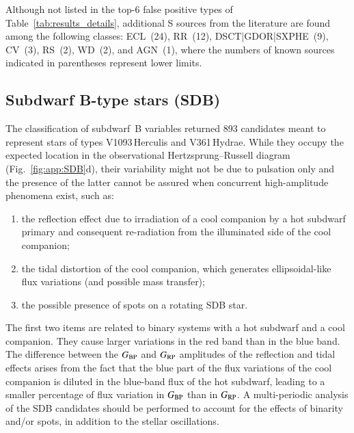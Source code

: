 \documentclass[longauth]{aa}
\def\bp{$G_{\rm BP}$\xspace}
\def\rp{$G_{\rm RP}$\xspace}
\begin{document}
Although not listed in the top-6 false positive types of Table~\ref{tab:results_details}, additional S sources from the literature are found among the following classes: ECL~(24), RR~(12), DSCT|GDOR|SXPHE~(9), CV~(3), RS~(2), WD~(2), and AGN~(1), where the numbers of known sources indicated in parentheses represent lower limits. 


\subsection{Subdwarf B-type stars (SDB)\label{ssec:sdb}}

The classification of subdwarf~B variables returned 893 candidates meant to represent stars of types V1093\,Herculis and V361\,Hydrae. While they occupy the expected location in the observational Hertzsprung--Russell diagram (Fig.~\ref{fig:app:SDB}d), their variability might not be due to pulsation only and the presence of the latter cannot be assured when concurrent high-amplitude phenomena exist, such as:
\begin{enumerate}
\item the reflection effect due to irradiation of a cool companion by a hot subdwarf primary and consequent re-radiation from the illuminated side of the cool companion;
\item the tidal distortion of the cool companion, which generates ellipsoidal-like flux variations (and possible mass transfer);
\item the possible presence of spots on a rotating SDB star.
\end{enumerate}
The first two items are related to binary systems with a hot subdwarf and a cool companion. They cause larger variations in the red band than in the blue band. The difference between the \bp and \rp amplitudes of the reflection and tidal effects arises from the fact that the blue part of the flux variations of the cool companion is diluted in the blue-band flux of the hot subdwarf, leading to a smaller percentage of flux variation in \bp than in \rp \citep[for example, see][]{2014A&A...570A..70S}.
A multi-periodic analysis of the SDB candidates should be performed to account for the effects of binarity and/or spots, in addition to the stellar oscillations.
\end{document}
